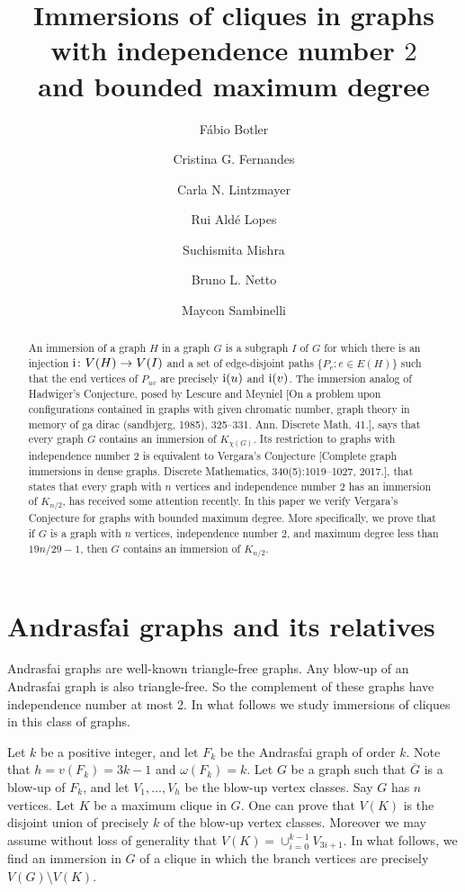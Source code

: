 \documentclass[a4paper,12pt]{article}
\title{Immersions of cliques in graphs \\ with independence number \(2\) \\ and bounded maximum degree}
\author{Fábio Botler \and Cristina G. Fernandes \and Carla N. Lintzmayer \and Rui Aldé Lopes \and Suchismita Mishra  \and Bruno L. Netto  \and Maycon Sambinelli}
\newcommand{\ifun}{{\rm i}}
\begin{document}
\maketitle

\begin{abstract}
An immersion of a graph \(H\) in a graph \(G\)
is a subgraph \(I\) of \(G\) for which there is an injection \(\ifun \colon V(H) \to V(I)\)
and a set of edge-disjoint paths \(\{P_e : e \in E(H)\}\) 
such that the end vertices of \(P_{uv}\) are precisely \(\ifun(u)\) and \(\ifun(v)\).
The immersion analog of Hadwiger's Conjecture, posed by Lescure and Meyniel 
[On a problem upon configurations contained in graphs
with given chromatic number, graph theory in memory of ga dirac (sandbjerg, 1985),
325–331. Ann. Discrete Math, 41.],
says that every graph \(G\) contains an immersion of \(K_{\chi(G)}\).
Its restriction to graphs with independence number \(2\)
is equivalent to Vergara's Conjecture [Complete graph immersions in dense graphs. Discrete Mathematics,
340(5):1019–1027, 2017.],
that states that every graph with \(n\) vertices and independence number 2
has an immersion of \(K_{n/2}\),
has received some attention recently.
In this paper we verify Vergara's Conjecture for graphs with bounded maximum degree.
More specifically, we prove that if \(G\) is a graph with \(n\) vertices,
independence number \(2\), and maximum degree less than \(19n/29 - 1\),
then \(G\) contains an immersion of \(K_{n/2}\).
\end{abstract}



\section{Andrasfai graphs and its relatives}

Andrasfai graphs are well-known triangle-free graphs. 
Any blow-up of an Andrasfai graph is also triangle-free.
So the complement of these graphs have independence number at most 2. 
In what follows we study immersions of cliques in this class of graphs. 
 
Let \(k\) be a positive integer, and let \(F_k\) be the Andrasfai graph of order $k$.
Note that \(h = v(F_k) = 3k-1\) and \(\omega(F_k) = k\).
Let \(G\) be a graph such that \(\overline{G}\) is a blow-up of \(F_k\), 
and let \(V_1,\ldots, V_h\) be the blow-up vertex classes.
Say \(G\) has \(n\) vertices.
Let \(K\) be a maximum clique in \(G\).
One can prove that \(V(K)\) is the disjoint union of precisely \(k\) of the blow-up vertex classes.
Moreover we may assume without loss of generality that \(V(K) = \cup_{i=0}^{k-1} V_{3i+1}\).
In what follows, we find an immersion in \(G\) of a clique in which the branch vertices are 
precisely \(V(G)\setminus V(K)\).
\end{document}
